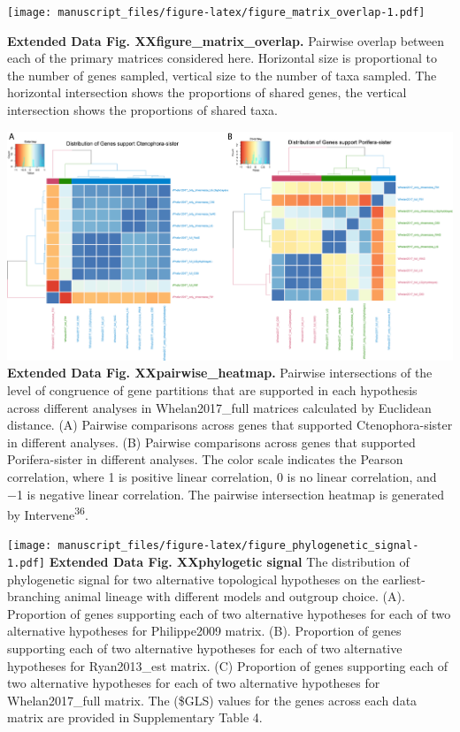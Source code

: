 \documentclass[]{article}
\begin{document}
\texttt{[image: manuscript\_files/figure-latex/figure\_matrix\_overlap-1.pdf]}

\textbf{Extended Data Fig. XXfigure\_matrix\_overlap.} Pairwise overlap
between each of the primary matrices considered here. Horizontal size is
proportional to the number of genes sampled, vertical size to the number
of taxa sampled. The horizontal intersection shows the proportions of
shared genes, the vertical intersection shows the proportions of shared
taxa.

\includegraphics{figures/Figure_Pairwise_heatmap_animal_root.png}
\textbf{Extended Data Fig. XXpairwise\_heatmap.} Pairwise intersections
of the level of congruence of gene partitions that are supported in each
hypothesis across different analyses in Whelan2017\_full matrices
calculated by Euclidean distance. (A) Pairwise comparisons across genes
that supported Ctenophora-sister in different analyses. (B) Pairwise
comparisons across genes that supported Porifera-sister in different
analyses. The color scale indicates the Pearson correlation, where 1 is
positive linear correlation, 0 is no linear correlation, and −1 is
negative linear correlation. The pairwise intersection heatmap is
generated by Intervene\textsuperscript{36}.

\texttt{[image: manuscript\_files/figure-latex/figure\_phylogenetic\_signal-1.pdf]}
\textbf{Extended Data Fig. XXphylogetic signal} The distribution of
phylogenetic signal for two alternative topological hypotheses on the
earliest-branching animal lineage with different models and outgroup
choice. (A). Proportion of genes supporting each of two alternative
hypotheses for each of two alternative hypotheses for Philippe2009
matrix. (B). Proportion of genes supporting each of two alternative
hypotheses for each of two alternative hypotheses for Ryan2013\_est
matrix. (C) Proportion of genes supporting each of two alternative
hypotheses for each of two alternative hypotheses for Whelan2017\_full
matrix. The (\Delta\$GLS) values for the genes across each data matrix
are provided in Supplementary Table 4.
\end{document}
